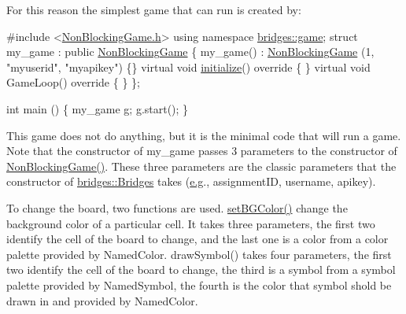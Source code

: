 For this reason the simplest game that can run is created by\+:


\begin{DoxyCode}
\textcolor{preprocessor}{#include <\hyperlink{_non_blocking_game_8h}{NonBlockingGame.h}>}
\textcolor{keyword}{using namespace }\hyperlink{namespacebridges_1_1game}{bridges::game};
\textcolor{keyword}{struct }my\_game : \textcolor{keyword}{public} \hyperlink{classbridges_1_1game_1_1_non_blocking_game}{NonBlockingGame} \{
  my\_game() : \hyperlink{classbridges_1_1game_1_1_non_blocking_game}{NonBlockingGame} (1, \textcolor{stringliteral}{"myuserid"},  \textcolor{stringliteral}{"myapikey"}) \{\}
  \textcolor{keyword}{virtual} \textcolor{keywordtype}{void} \hyperlink{classbridges_1_1game_1_1_game_base_a9b6eb6fa7fceaac09d204b549164037f}{initialize}()\textcolor{keyword}{ override }\{ \}
  \textcolor{keyword}{virtual} \textcolor{keywordtype}{void} GameLoop()\textcolor{keyword}{ override }\{ \}
\};

\textcolor{keywordtype}{int} main () \{
  my\_game \hyperlink{namespacebridges_1_1game_ab9a19c7ab6e2ebac2f95180e21733487ab2f5ff47436671b6e533d8dc3614845d}{g};
  g.start();
\}
\end{DoxyCode}


This game does not do anything, but it is the minimal code that will run a game. Note that the constructor of my\+\_\+game passes 3 parameters to the constructor of \hyperlink{classbridges_1_1game_1_1_non_blocking_game_a3226aa7e7ff129e916f4bd5aabcb2e72}{Non\+Blocking\+Game()}. These three parameters are the classic parameters that the constructor of \hyperlink{classbridges_1_1_bridges}{bridges\+::\+Bridges} takes (\hyperlink{namespacebridges_1_1game_ab9a19c7ab6e2ebac2f95180e21733487ab2f5ff47436671b6e533d8dc3614845d}{e.\+g}., assignment\+ID, username, apikey).

To change the board, two functions are used. \hyperlink{classbridges_1_1game_1_1_game_base_ab667bbca1c81e5fb3aa8d81d70fe8cd2}{set\+B\+G\+Color()} change the background color of a particular cell. It takes three parameters, the first two identify the cell of the board to change, and the last one is a color from a color palette provided by Named\+Color. draw\+Symbol() takes four parameters, the first two identify the cell of the board to change, the third is a symbol from a symbol palette provided by Named\+Symbol, the fourth is the color that symbol shold be drawn in and provided by Named\+Color.

